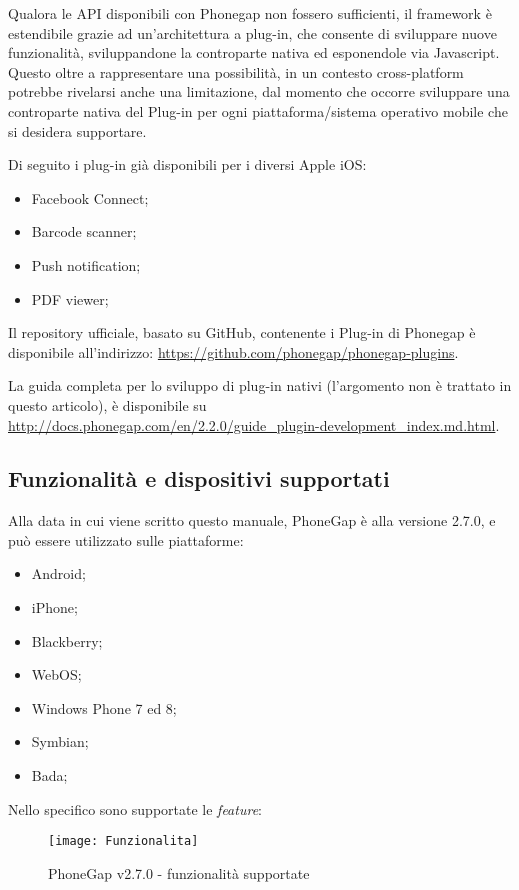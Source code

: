 \documentclass[10pt,a4paper,onecolumn]{article}
\begin{document}
Qualora le API disponibili con Phonegap non fossero sufficienti, il framework è estendibile grazie ad un'architettura a plug-in, che consente di sviluppare nuove funzionalità, sviluppandone la controparte nativa ed esponendole via Javascript. Questo oltre a rappresentare una possibilità, in un contesto cross-platform potrebbe rivelarsi anche una limitazione, dal momento che occorre sviluppare una controparte nativa del Plug-in per ogni piattaforma/sistema operativo mobile che si desidera supportare.

Di seguito i plug-in già disponibili per i diversi Apple iOS:

\begin{itemize}
	\item Facebook Connect;
	\item Barcode scanner;
	\item Push notification;
	\item PDF viewer;
\end{itemize}

Il repository ufficiale, basato su GitHub, contenente i Plug-in di Phonegap è disponibile all'indirizzo: \url{https://github.com/phonegap/phonegap-plugins}.

La guida completa per lo sviluppo di plug-in nativi (l'argomento non è trattato in questo articolo), è disponibile su \url{http://docs.phonegap.com/en/2.2.0/guide_plugin-development_index.md.html}.

\subsection{Funzionalità e dispositivi supportati}

	Alla data in cui viene scritto questo manuale, PhoneGap è alla versione 2.7.0, e può essere utilizzato sulle piattaforme:
	
\begin{itemize}
	\item Android;
	\item iPhone;
	\item Blackberry;
	\item WebOS;
	\item Windows Phone 7 ed 8;
	\item Symbian;
	\item Bada;
\end{itemize}

Nello specifico sono supportate le \textit{feature}:

\begin{figure}[h]
	\centering
	\texttt{[image: Funzionalita]}
	\caption{PhoneGap v2.7.0 - funzionalità supportate}						
	\label{fig:funzionalita}
\end{figure}
\end{document}
